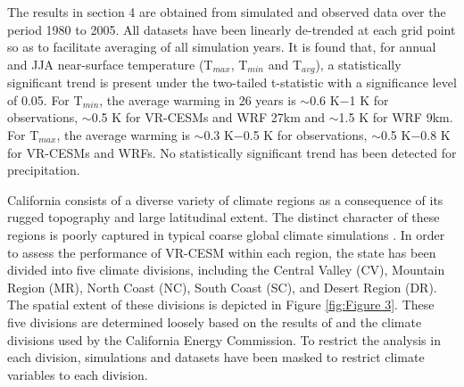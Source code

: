 \documentclass[ms]{agutex}   %
\begin{document}
\begin{article}
The results in section 4 are obtained from simulated and observed data over the period 1980 to 2005.  All datasets have been linearly de-trended at each grid point so as to facilitate averaging of all simulation years. It is found that, for annual and JJA near-surface temperature (T$_{max}$, T$_{min}$ and T$_{avg}$), a statistically significant trend is present under the two-tailed t-statistic with a significance level of 0.05. For T$_{min}$, the average warming in 26 years is $\sim$0.6 K$-$1 K for observations, $\sim$0.5 K for VR-CESMs and WRF 27km and $\sim$1.5 K for WRF 9km. For T$_{max}$, the average warming is $\sim$0.3 K$-$0.5 K for observations, $\sim$0.5 K$-$0.8 K for VR-CESMs and WRFs. No statistically significant trend has been detected for precipitation.

California consists of a diverse variety of climate regions as a consequence of its rugged topography and large latitudinal extent.  The distinct character of these regions is poorly captured in typical coarse global climate simulations \citep{abatzoglou2009classification, caldwell2009evaluation}.  In order to assess the performance of VR-CESM within each region, the state has been divided into five climate divisions, including the Central Valley (CV), Mountain Region (MR), North Coast (NC), South Coast (SC), and Desert Region (DR).  The spatial extent of these divisions is depicted in Figure \ref{fig:Figure 3}. These five divisions are determined loosely based on the results of \cite{abatzoglou2009classification} and the climate divisions used by the California Energy Commission. To restrict the analysis in each division, simulations and datasets have been masked to restrict climate variables to each division. 



\end{article}
\end{document}
